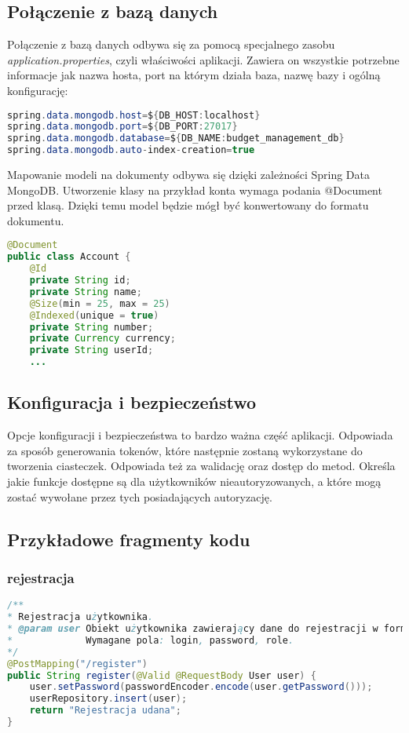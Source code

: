 \subsection*{Połączenie z bazą danych}
Połączenie z bazą danych odbywa się za pomocą specjalnego zasobu \textit{application.properties}, czyli właściwości aplikacji. Zawiera on wszystkie potrzebne informacje jak nazwa hosta, port na którym działa baza, nazwę bazy i ogólną konfigurację: 
\begin{lstlisting}[language={Java}, caption={application.properties}, label={lst:java-application.properties}]
spring.data.mongodb.host=${DB_HOST:localhost}
spring.data.mongodb.port=${DB_PORT:27017}
spring.data.mongodb.database=${DB_NAME:budget_management_db}
spring.data.mongodb.auto-index-creation=true
\end{lstlisting}

Mapowanie modeli na dokumenty odbywa się dzięki zależności Spring Data MongoDB. Utworzenie klasy na przykład konta wymaga podania @Document przed klasą. Dzięki temu model będzie mógł być konwertowany do formatu dokumentu.
\begin{lstlisting}[language={Java}, caption={Fragment modelu Account}, label={lst:java-Account}]
@Document
public class Account {
	@Id
	private String id;
	private String name;
	@Size(min = 25, max = 25)
	@Indexed(unique = true)
	private String number;
	private Currency currency;
	private String userId;
	...
\end{lstlisting}
\subsection*{Konfiguracja i bezpieczeństwo}
Opcje konfiguracji i bezpieczeństwa to bardzo ważna część aplikacji. Odpowiada za sposób generowania tokenów, które następnie zostaną wykorzystane do tworzenia ciasteczek. Odpowiada też za walidację oraz dostęp do metod. Określa jakie funkcje dostępne są dla użytkowników nieautoryzowanych, a które mogą zostać wywołane przez tych posiadających autoryzację. 
\subsection*{Przykładowe fragmenty kodu}
\subsubsection*{rejestracja}
\begin{lstlisting}[language={Java}, caption={Rejestracja użytkownika}, label={lst:java-register}]
/**
* Rejestracja użytkownika.
* @param user Obiekt użytkownika zawierający dane do rejestracji w formacie JSON.
*             Wymagane pola: login, password, role.
*/
@PostMapping("/register")
public String register(@Valid @RequestBody User user) {
	user.setPassword(passwordEncoder.encode(user.getPassword()));
	userRepository.insert(user);
	return "Rejestracja udana";
}
\end{lstlisting}
